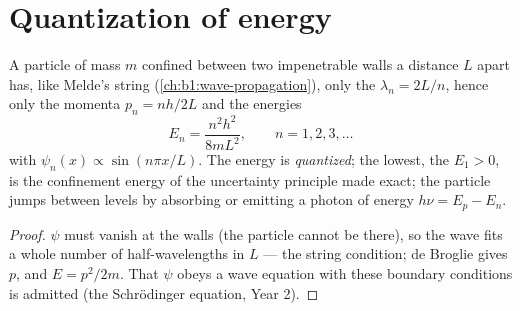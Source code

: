 \section{Quantization of energy}

\begin{proposition}\label{prop:b1:quantum-introduction:box}
A particle of mass $m$ confined between two impenetrable walls a
distance $L$ apart has, like Melde's string
(\cref{ch:b1:wave-propagation}), only the  $\lambda_n = 2L/n$,
hence only the momenta $p_n = nh/2L$ and the energies
\[
E_n = \frac{n^2h^2}{8mL^2} , \qquad n = 1, 2, 3, \ldots
\]
with  $\psi_n(x) \propto \sin(n\pi x/L)$. The energy is
\emph{quantized}; the lowest, the \emph{} $E_1 > 0$, is the
confinement energy of the uncertainty principle made exact; the
particle jumps between levels by absorbing or emitting a photon of
energy $h\nu = E_p - E_n$.
\end{proposition}

\begin{proof}
$\psi$ must vanish at the walls (the particle cannot be there), so the
wave fits a whole number of half-wavelengths in $L$ --- the string
condition; de Broglie gives $p$, and $E = p^2/2m$. That $\psi$ obeys
a wave equation with these boundary conditions is admitted (the
Schrödinger equation, Year 2).
\end{proof}

